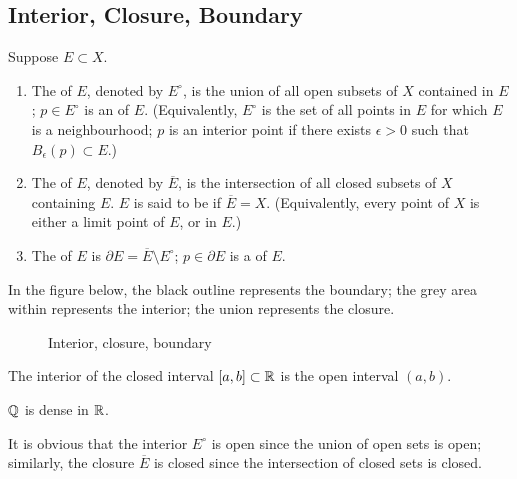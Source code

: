 \subsection{Interior, Closure, Boundary}
\begin{definition}
Suppose $E\subset X$.
\begin{enumerate}[label=(\roman*)]
\item The  of $E$, denoted by $E^\circ$, is the union of all open subsets of $X$ contained in $E$; $p\in E^\circ$ is an  of $E$. (Equivalently, $E^\circ$ is the set of all points in $E$ for which $E$ is a neighbourhood; $p$ is an interior point if there exists $\epsilon>0$ such that $B_\epsilon(p)\subset E$.)

\item The  of $E$, denoted by $\overline{E}$, is the intersection of all closed subsets of $X$ containing $E$. $E$ is said to be  if $\overline{E}=X$. (Equivalently, every point of $X$ is either a limit point of $E$, or in $E$.)

\item The  of $E$ is $\partial E=\overline{E}\setminus E^\circ$; $p\in\partial E$ is a  of $E$.
\end{enumerate}
\end{definition}

In the figure below, the black outline represents the boundary; the grey area within represents the interior; the union represents the closure.
\begin{figure}[H]
\centering
{}
\caption{Interior, closure, boundary}
\end{figure}

\begin{example}
The interior of the closed interval $[a,b]\subset\mathbb R$ is the open interval $(a,b)$.

$\mathbb Q$ is dense in $\mathbb R$.
\end{example}

\begin{remark}
It is obvious that the interior $E^\circ$ is open since the union of open sets is open; similarly, the closure $\overline{E}$ is closed since the intersection of closed sets is closed.
\end{remark}


